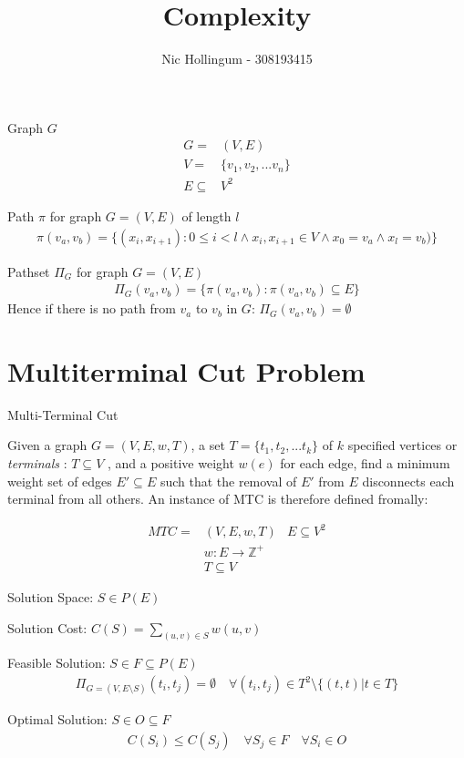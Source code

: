 \documentclass{article}
\author{Nic Hollingum - 308193415}
\title{Complexity}
\begin{document}
\begin{definition}
Graph $G$
\begin{align}
	\nonumber G = & (V,E) \\
	\nonumber V = & \{v_1, v_2, ... v_n\} \\
	\nonumber E \subseteq & V^2
\end{align}
\end{definition}

\begin{definition}
Path $\pi$ for graph $G = (V,E)$ of length $l$
\begin{align}
	\nonumber \pi(v_a, v_b) = \{(x_i, x_{i+1}) : 0 \leq i < l \wedge x_i, x_{i+1} \in V \wedge x_0 = v_a \wedge x_l = v_b)\}
\end{align}
\end{definition}

\begin{definition}
Pathset $\Pi_G$ for graph $G = (V,E)$
\begin{align}
	\nonumber \Pi_G(v_a, v_b) = \{\pi(v_a, v_b) : \pi(v_a, v_b) \subseteq E\}
\end{align}
Hence if there is no path from $v_a$ to $v_b$ in $G$: $\Pi_G(v_a, v_b) = \emptyset$
\end{definition}


\section{Multiterminal Cut Problem}

\begin{definition}
Multi-Terminal Cut

Given a graph $G=(V,E,w,T)$, a set $T=\{t_1, t_2, ... t_k\}$ of $k$ specified vertices or {\em terminals} : $T \subseteq V$ , and a positive weight $w(e)$ for each edge, find a minimum weight set of edges $E' \subseteq E$ such that the removal of $E'$ from $E$ disconnects each terminal from all others.
An instance of MTC is therefore defined fromally:

\begin{align}
	\nonumber MTC = & (V,E,w,T)
	\nonumber & E \subseteq V^2\\
	\nonumber & w : E \rightarrow \mathbb{Z}^+\\
	\nonumber & T \subseteq V
\end{align}

Solution Space: $S \in P(E)$

Solution Cost: $C(S) = \displaystyle\sum\limits_{(u,v) \in S} w(u,v)$

Feasible Solution: $S \in F \subseteq P(E)$
\begin{align}
	\nonumber \Pi_{G=(V,E \setminus S)}(t_i, t_j) = \emptyset \quad \forall (t_i, t_j) \in T^2 \setminus \{(t, t) | t \in T\}
\end{align}

Optimal Solution: $S \in O \subseteq F$
\begin{align}
	\nonumber C(S_i) \leq C(S_j) \quad \forall S_j \in F \quad \forall S_i \in O
\end{align}

\end{definition}
\end{document}
